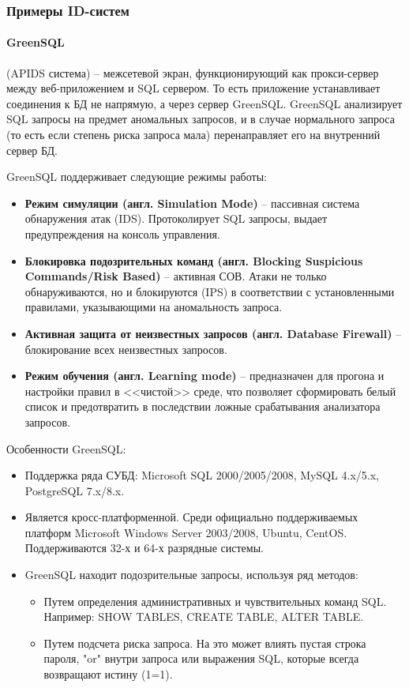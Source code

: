 \subsubsection{Примеры ID-систем}


\paragraph*{GreenSQL} (APIDS система) -- межсетевой экран, функционирующий как прокси-сервер между 
веб-приложением и SQL сервером. То есть приложение устанавливает соединения к БД не напрямую, а 
через сервер GreenSQL. GreenSQL анализирует SQL запросы на предмет аномальных запросов, и в случае 
нормального запроса (то есть если степень риска запроса мала) перенаправляет его на внутренний сервер БД.

GreenSQL поддерживает следующие режимы работы:
\begin{itemize}
	\item \textbf{Режим симуляции (англ. Simulation Mode)} -- пассивная система обнаружения атак (IDS). 
	Протоколирует SQL запросы, выдает предупреждения на консоль управления.
	\item \textbf{Блокировка подозрительных команд (англ. Blocking Suspicious Commands/Risk Based)} -- активная СОВ. 
	Атаки не только обнаруживаются, но и блокируются (IPS) в соответствии с установленными правилами, 
	указывающими на аномальность запроса.
	\item \textbf{Активная защита от неизвестных запросов (англ. Database Firewall)} -- 
	блокирование всех неизвестных запросов.
	\item \textbf{Режим обучения (англ. Learning mode)} -- предназначен для прогона и настройки правил 
	в <<чистой>> среде, что позволяет сформировать белый список и предотвратить в последствии ложные 
	срабатывания анализатора запросов.
\end{itemize}

Особенности GreenSQL:
\begin{itemize}
	\item Поддержка ряда СУБД: Microsoft SQL 2000/2005/2008, MySQL 4.x/5.x, PostgreSQL 7.x/8.x. 
	\item Является кросс-платформенной. Среди официально поддерживаемых платформ Microsoft 
	Windows Server 2003/2008, Ubuntu, CentOS. Поддерживаются 32-х и 64-х разрядные системы.
	\item GreenSQL находит подозрительные запросы, используя ряд методов: 
	\begin{itemize}
		\item Путем определения административных и чувствительных команд SQL. Например: SHOW TABLES, CREATE TABLE, ALTER TABLE.
		\item Путем подсчета риска запроса. На это может влиять пустая строка пароля, "or" внутри запроса или выражения SQL, 
		которые всегда возвращают истину (1=1).
	\end{itemize}
\end{itemize}


